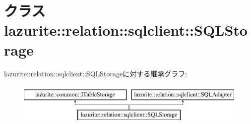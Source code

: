 \hypertarget{classlazurite_1_1relation_1_1sqlclient_1_1_s_q_l_storage}{
\section{クラス lazurite::relation::sqlclient::SQLStorage}
\label{classlazurite_1_1relation_1_1sqlclient_1_1_s_q_l_storage}
}
lazurite::relation::sqlclient::SQLStorageに対する継承グラフ:\begin{figure}[H]
\begin{center}
\leavevmode
\includegraphics[height=2cm]{classlazurite_1_1relation_1_1sqlclient_1_1_s_q_l_storage}
\end{center}
\end{figure}
